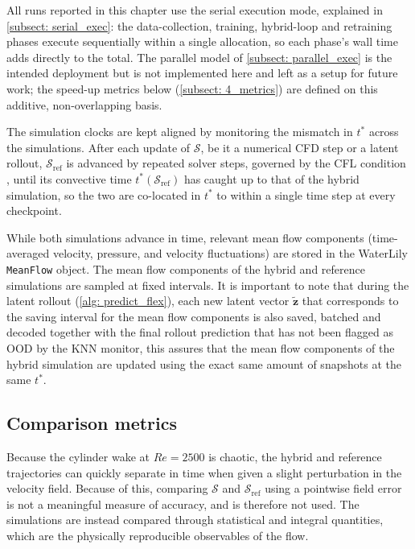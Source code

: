 All runs reported in this chapter use the serial execution mode, explained in \autoref{subsect: serial_exec}: the data-collection, training, hybrid-loop and retraining phases execute sequentially within a single allocation, so each phase's wall time adds directly to the total. The parallel model of \autoref{subsect: parallel_exec} is the intended deployment but is not implemented here and left as a setup for future work; the speed-up metrics below (\autoref{subsect: 4_metrics}) are defined on this additive, non-overlapping basis.

The simulation clocks are kept aligned by monitoring the mismatch in $t^*$ across the simulations. After each update of $\mathcal{S}$, be it a numerical CFD step or a latent rollout, $\mathcal{S}_\text{ref}$ is advanced by repeated solver steps, governed by the CFL condition \cite{Weymouth2025}, until its convective time $t^*(\mathcal{S}_\text{ref})$ has caught up to that of the hybrid simulation, so the two are co-located in $t^*$ to within a single time step at every checkpoint.

While both simulations advance in time, relevant mean flow components (time-averaged velocity, pressure, and velocity fluctuations) are stored in the WaterLily \texttt{MeanFlow} object. The mean flow components of the hybrid and reference simulations are sampled at fixed intervals. It is important to note that during the latent rollout (\autoref{alg: predict_flex}), each new latent vector $\tilde{\mathbf{z}}$ that corresponds to the saving interval for the mean flow components is also saved, batched and decoded together with the final rollout prediction that has not been flagged as OOD by the KNN monitor, this assures that the mean flow components of the hybrid simulation are updated using the exact same amount of snapshots at the same $t^*$. 



\subsection{Comparison metrics} 
\label{subsect: 4_metrics}
Because the cylinder wake at $Re = 2500$ is chaotic, the hybrid and reference trajectories can quickly separate in time when given a slight perturbation in the velocity field. Because of this, comparing $\mathcal{S}$ and $\mathcal{S}_\text{ref}$ using a pointwise field error is not a meaningful measure of accuracy, and is therefore not used. The simulations are instead compared through statistical and integral quantities, which are the physically reproducible observables of the flow.

